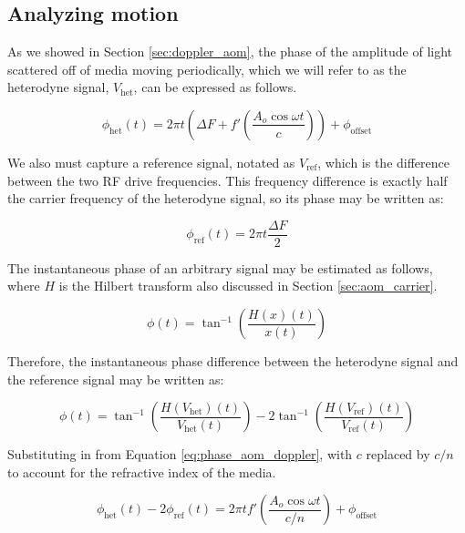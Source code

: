 \subsection{Analyzing motion}
\label{sec:sigproc_mo_anal}


As we showed in Section \ref{sec:doppler_aom}, the phase of the amplitude of light scattered off of media moving periodically, which we will refer to as the heterodyne signal, $V_{\mathrm{het}}$, can be expressed as follows.

\begin{equation}
\phi_{\mathrm{het}}(t) = 2 \pi t \left(\Delta F + f' \left( \frac{A_o \cos{\omega t}}{c} \right)   \right) + \phi_{\mathrm{offset}}
\end{equation}

We also must capture a reference signal, notated as $V_{\mathrm{ref}}$, which is the difference between the two RF drive frequencies. This frequency difference is exactly half the carrier frequency of the heterodyne signal, so its phase may be written as:

\begin{equation}
\phi_{\mathrm{ref}}(t) = 2 \pi t \frac{\Delta F}{2}
\end{equation}

The instantaneous phase of an arbitrary signal may be estimated as follows, where $H$ is the Hilbert transform also discussed in Section \ref{sec:aom_carrier}.

\begin{equation}
\phi(t) = \tan^{-1} \left( \frac{H(x)(t)}{x(t)} \right)
\end{equation}

Therefore, the instantaneous phase difference between the heterodyne signal and the reference signal may be written as:

\begin{equation}
\phi(t) = \tan^{-1}\left( \frac{H(V_{\mathrm{het}})(t)}{V_{\mathrm{het}}(t)} \right) - 2\tan^{-1}\left( \frac{H(V_{\mathrm{ref}})(t)}{V_{\mathrm{ref}}(t)} \right)
\end{equation}

Substituting in from Equation \ref{eq:phase_aom_doppler}, with $c$ replaced by $c/n$ to account for the refractive index of the media.

\begin{equation}
\phi_{\mathrm{het}}(t) - 2 \phi_{\mathrm{ref}}(t) = 2 \pi t f'  \left( \frac{A_o \cos{\omega t}}{c/n} \right) + \phi_{\mathrm{offset}}
\end{equation}

